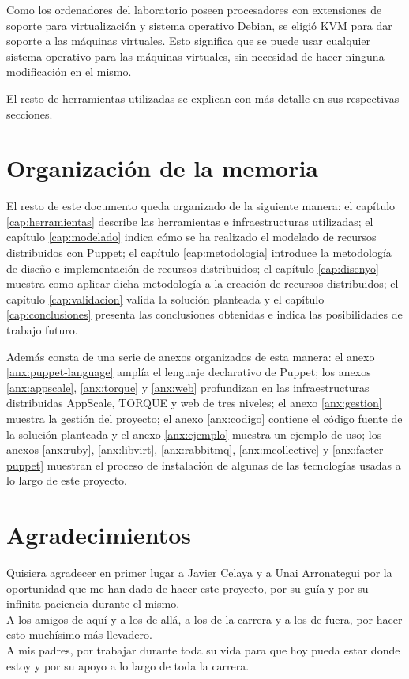 Como los ordenadores del laboratorio poseen procesadores con extensiones de soporte para virtualización y sistema operativo Debian, se eligió KVM para dar soporte a las máquinas virtuales. Esto significa que se puede usar cualquier sistema operativo para las máquinas virtuales, sin necesidad de hacer ninguna modificación en el mismo.

El resto de herramientas utilizadas se explican con más detalle en sus respectivas secciones.


\section{Organización de la memoria}


El resto de este documento queda organizado de la siguiente manera: el capítulo \ref{cap:herramientas} describe las herramientas e infraestructuras utilizadas; el capítulo \ref{cap:modelado} indica cómo se ha realizado el modelado de recursos distribuidos con Puppet; el capítulo \ref{cap:metodologia} introduce la metodología de diseño e implementación de recursos distribuidos; el capítulo \ref{cap:disenyo} muestra como aplicar dicha metodología a la creación de recursos distribuidos; el capítulo \ref{cap:validacion} valida la solución planteada y el capítulo \ref{cap:conclusiones} presenta las conclusiones obtenidas e indica las posibilidades de trabajo futuro.

Además consta de una serie de anexos organizados de esta manera: el anexo \ref{anx:puppet-language} amplía el lenguaje declarativo de Puppet; los anexos \ref{anx:appscale}, \ref{anx:torque} y \ref{anx:web} profundizan en las infraestructuras distribuidas AppScale, TORQUE y web de tres niveles; el anexo \ref{anx:gestion} muestra la gestión del proyecto; el anexo \ref{anx:codigo} contiene el código fuente de la solución planteada y el anexo \ref{anx:ejemplo} muestra un ejemplo de uso; los anexos \ref{anx:ruby}, \ref{anx:libvirt}, \ref{anx:rabbitmq}, \ref{anx:mcollective} y \ref{anx:facter-puppet} muestran el proceso de instalación de algunas de las tecnologías usadas a lo largo de este proyecto.


\section{Agradecimientos}


Quisiera agradecer en primer lugar a Javier Celaya y a Unai Arronategui por la oportunidad que me han dado de hacer este proyecto, por su guía y por su infinita paciencia durante el mismo. \\

A los amigos de aquí y a los de allá, a los de la carrera y a los de fuera, por hacer esto muchísimo más llevadero. \\

A mis padres, por trabajar durante toda su vida para que hoy pueda estar donde estoy y por su apoyo a lo largo de toda la carrera. \\
